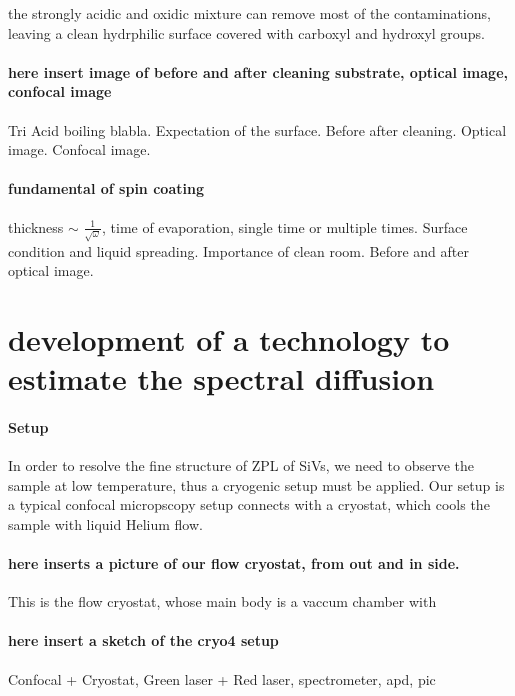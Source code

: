the strongly acidic and oxidic mixture can remove most of the contaminations, leaving a clean hydrphilic surface covered with carboxyl and hydroxyl groups.

\paragraph {here insert image of before and after cleaning substrate, optical image, confocal image }
Tri Acid boiling blabla. Expectation of the surface. Before after cleaning. Optical image. Confocal image.

\paragraph{fundamental of spin coating} thickness $\sim$ $\frac{1}{\sqrt{\omega}}$, time of evaporation, single time or multiple times. Surface condition and liquid spreading. Importance of clean room. Before and after optical image.
\section[development of a technology to estimate the spectral diffusion]{development of a technology to estimate the spectral diffusion}

\paragraph{Setup} 

In order to resolve the fine structure of ZPL of SiVs, we need to observe the sample at low temperature, thus a cryogenic setup must be applied.
Our setup is a typical confocal micropscopy setup connects with a cryostat, which cools the sample with liquid Helium flow.

\paragraph{here inserts a picture of our flow cryostat, from out and in side.}
This is the flow cryostat, whose main body is a vaccum chamber with

\paragraph{here insert a sketch of the cryo4 setup}
Confocal + Cryostat, Green laser + Red laser, spectrometer, apd, pic


